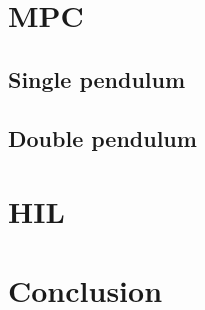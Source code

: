     \section{MPC}
        \FloatBarrier\subsection{Single pendulum}
        \FloatBarrier\subsection{Double pendulum}

    \section{HIL}

    \section{Conclusion}



